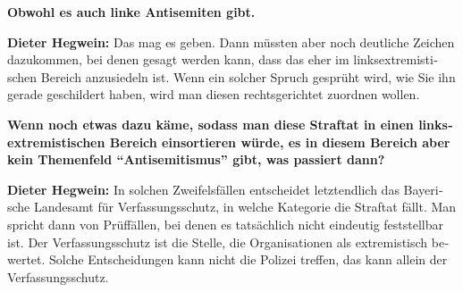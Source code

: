 \begin{otherlanguage}{ngerman}
\textbf{Obwohl es auch linke Antisemiten gibt.}

\textbf{Dieter Hegwein:} Das mag es geben. Dann müssten aber noch deutliche Zeichen dazukommen, bei denen gesagt werden kann, dass das eher im linksextremistischen Bereich anzusiedeln ist. Wenn ein solcher Spruch gesprüht wird, wie Sie ihn gerade geschildert haben, wird man diesen rechtsgerichtet zuordnen wollen.

\textbf{Wenn noch etwas dazu käme, sodass man diese Straftat in einen linksextremistischen Bereich einsortieren würde, es in diesem Bereich aber kein Themenfeld "`Antisemitismus"' gibt, was passiert dann?} 

\textbf{Dieter Hegwein:} In solchen Zweifelsfällen entscheidet letztendlich das Bayerische Landesamt für Verfassungsschutz, in welche Kategorie die Straftat fällt. Man spricht dann von Prüffällen, bei denen es tatsächlich nicht eindeutig feststellbar ist. Der Verfassungsschutz ist die Stelle, die Organisationen als extremistisch bewertet. Solche Entscheidungen kann nicht die Polizei treffen, das kann allein der Verfassungsschutz.

\end{otherlanguage}
